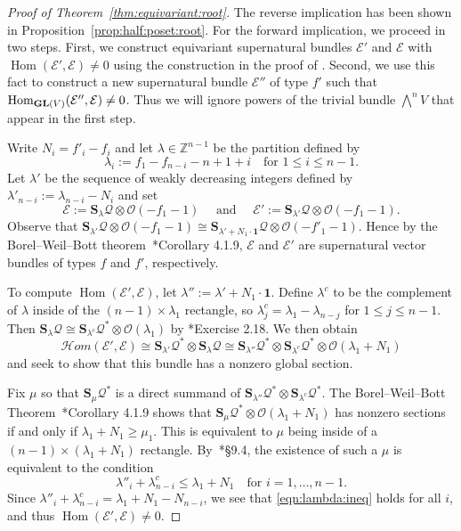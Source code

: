 \documentclass[12pt]{amsart}
\theoremstyle{definition}
\newcommand{\Hom}{\operatorname{Hom}}
\newcommand{\sheafHom}{\mathcal{H}om}
\newcommand{\EE}{\mathcal{E}}
\newcommand{\cO}{{\mathcal O}}
\newcommand{\cQ}{\mathcal{Q}}
\newcommand{\Sc}{\mathbf{S}}
\newcommand{\GL}{{\bf GL}}
\begin{document}
\begin{proof}[Proof of Theorem~\ref{thm:equivariant:root}] 
  The reverse implication has been shown in
  Proposition~\ref{prop:half:poset:root}.  For the forward
  implication, we proceed in two steps.  First, we construct
  equivariant supernatural bundles $\EE'$ and $\EE$ with $\Hom(\EE',
  \EE) \ne 0$ using the construction in the proof of \cite[Theorem
  6.2]{EiScConjOfBS07}. Second, we use this fact to construct a new
  supernatural bundle $\EE''$ of type $f'$ such that
  $\Hom_{\GL(V)}(\EE'',\EE)\ne 0$.  Thus we will ignore powers of the
  trivial bundle $\bigwedge^n V$ that appear in the first step.
    
Write $N_i = f'_i - f_i$ and let $\lambda\in \mathbb Z^{n-1}$ be the 
partition defined by
\[
\lambda_i:= f_1 - f_{n-i} - n+1 + i \quad \text{for } 1 \le i \le n-1.
\]
Let $\lambda'$ be the sequence of weakly decreasing integers defined by 
$\lambda'_{n-i} := \lambda_{n-i} - N_i$ and set
\[
\EE := \Sc_\lambda \cQ \otimes \cO(-f_1 - 1)\quad \text{ and } \quad
\EE' := \Sc_{\lambda'} \cQ \otimes \cO(-f_1 - 1).
\]
Observe that $\Sc_{\lambda'} \cQ \otimes \cO(-f_1 - 1) \cong
\Sc_{\lambda' + N_1\cdot \mathbf{1}} \cQ \otimes \cO(-f'_1 - 1)$.
Hence by the Borel--Weil--Bott theorem~\cite{weyman}*{Corollary
  4.1.9}, $\EE$ and $\EE'$ are supernatural vector bundles of types
$f$ and $f'$, respectively.
  
To compute $\Hom(\EE',\EE)$, let $\lambda'' := \lambda' + N_1\cdot
\mathbf{1}$. Define $\lambda^c$ to be the complement of $\lambda$
inside of the $(n-1) \times \lambda_1$ rectangle, so $\lambda^c_j =
\lambda_1 - \lambda_{n-j}$ for $1 \le j \le n-1$.  Then
$\Sc_{\lambda}\cQ\cong \Sc_{\lambda^c}\cQ^* \otimes \cO(\lambda_1)$ by
\cite{weyman}*{Exercise 2.18}.  We then obtain
\[
\sheafHom(\EE', \EE) \cong \Sc_{\lambda'} \cQ^* \otimes \Sc_\lambda
\cQ \cong \Sc_{\lambda''} \cQ^* \otimes \Sc_{\lambda^c} \cQ^* \otimes
\cO(\lambda_1 + N_1)
\]
and seek to show that this bundle has a nonzero global section.
  
Fix $\mu$ so that $\Sc_\mu \cQ^*$ is a direct summand of
$\Sc_{\lambda''} \cQ^* \otimes \Sc_{\lambda^c} \cQ^*$.  The
Borel--Weil--Bott Theorem~\cite{weyman}*{Corollary 4.1.9} shows that
$\Sc_\mu \cQ^* \otimes \cO(\lambda_1 + N_1)$ has nonzero sections if and
only if $\lambda_1 + N_1 \ge \mu_1$.  This is equivalent to $\mu$ being
inside of a $(n-1) \times (\lambda_1+N_1)$
rectangle. By~\cite{fulton}*{\S9.4}, the existence of such a $\mu$ is
equivalent to the condition
\begin{equation}\label{eqn:lambda:ineq}
  \lambda''_i + \lambda^c_{n-i} \le  \lambda_1+N_1 \quad \text{for }
  i=1,\dots,n-1.
\end{equation} 
Since $\lambda''_i + \lambda^c_{n-i} = \lambda_1 + N_1 - N_{n-i}$, we
see that \eqref{eqn:lambda:ineq} holds for all $i$, and thus
$\Hom(\EE',\EE)\ne 0$.


\end{proof}
\end{document}

